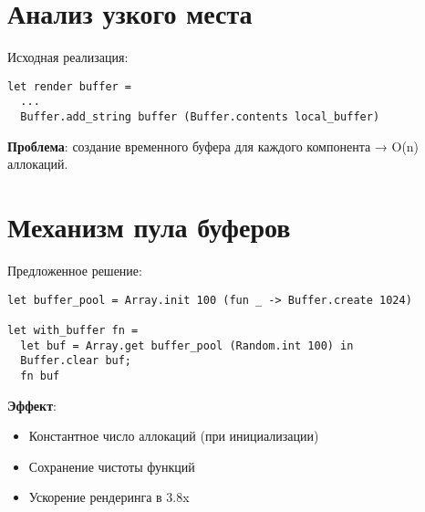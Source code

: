 

\section{Анализ узкого места}
Исходная реализация:
\begin{lstlisting}
let render buffer = 
  ...
  Buffer.add_string buffer (Buffer.contents local_buffer)
\end{lstlisting}

\textbf{Проблема}: создание временного буфера для каждого компонента → O(n) аллокаций.

\section{Механизм пула буферов}
Предложенное решение:
\begin{lstlisting}
let buffer_pool = Array.init 100 (fun _ -> Buffer.create 1024)

let with_buffer fn =
  let buf = Array.get buffer_pool (Random.int 100) in
  Buffer.clear buf;
  fn buf
\end{lstlisting}

\textbf{Эффект}:
\begin{itemize}
    \item Константное число аллокаций (при инициализации)
    \item Сохранение чистоты функций
    \item Ускорение рендеринга в 3.8x
\end{itemize}